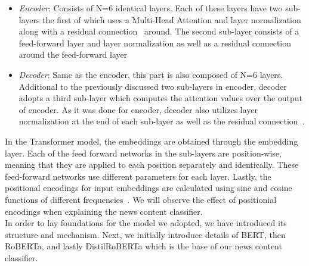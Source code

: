 \begin{itemize}
    \item \emph{Encoder}: Consists of N=6 identical layers. Each of these layers have two sub-layers the first of which uses a Multi-Head Attention and layer normalization~\parencite{LayerNorm_Ba} along with a residual connection~\parencite{ResidualConnection_He} around. The second sub-layer consists of a feed-forward layer and layer normalization as well as a residual connection around the feed-forward layer~\parencite{AttentionIsAllYouNeed_Vaswani}
    \item \emph{Decoder}: Same as the encoder, this part is also composed of N=6 layers. Additional to the previously discussed two sub-layers in encoder, decoder adopts a third sub-layer which computes the attention values over the output of encoder. As it was done for encoder, decoder also utilizes layer normalization at the end of each sub-layer as well as the residual connection~\parencite{AttentionIsAllYouNeed_Vaswani}.
\end{itemize}
In the Transformer model, the embeddings are obtained through the embedding layer. Each of the feed forward networks in the sub-layers are position-wise, meaning that they are applied to each position separately and identically. These feed-forward networks use different parameters for each layer. Lastly, the positional encodings for input embeddings are calculated using sine and cosine functions of different frequencies~\parencite{AttentionIsAllYouNeed_Vaswani}. We will observe the effect of positionial encodings when explaining the news content classifier.\\
In order to lay foundations for the model we adopted, we have introduced its structure and mechanism. Next, we initially introduce details of BERT, then RoBERTa, and lastly DistilRoBERTa which is the base of our news content classifier.

